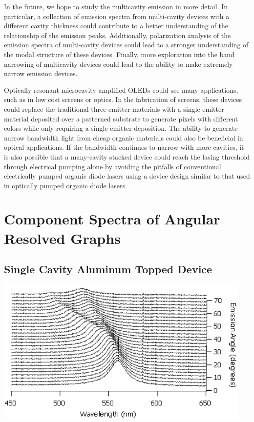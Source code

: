 \documentclass{report}
\begin{document}
    In the future, we hope to study the multicavity emission in more detail. In particular, a collection of emission spectra from multi-cavity devices with a different cavity thickness could contribute to a better understanding of the relationship of the emission peaks. Additionally, polarization analysis of the emission spectra of multi-cavity devices could lead to a stronger understanding of the modal structure of these devices. Finally, more exploration into the band narrowing of multicavity devices could lead to the ability to make extremely narrow emission devices.
    
    Optically resonant microcavity amplified OLEDs could see many applications, such as in low cost screens or optics. In the fabrication of screens, these devices could replace the traditional three emitter materials with a single emitter material deposited over a patterned substrate to generate pixels with different colors while only requiring a single emitter deposition. The ability to generate narrow bandwidth light from cheap organic materials could also be beneficial in optical applications. If the bandwidth continues to narrow with more cavities, it is also possible that a many-cavity stacked device could reach the lasing threshold through electrical pumping alone by avoiding the pitfalls of conventional electrically pumped organic diode lasers\cite{Baldo2002} using a device design similar to that used in optically pumped organic diode lasers\cite{Bulovi1998}.
    
    \printbibliography

\appendix
\chapter{Component Spectra of Angular Resolved Graphs} \label{components}

    \section*{Single Cavity Aluminum Topped Device}
    \begin{center}
    \includegraphics[width=0.95\textwidth]{images/n1_al_top_waterfall.png}
    \end{center}
    
\end{document}
